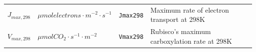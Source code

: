 \documentclass[]{book}
\begin{document}
\begin{longtable}[]{@{}llll@{}}
\begin{minipage}[t]{0.11\columnwidth}\raggedright\strut
\(J_{max, 298}\)\strut
\end{minipage} & \begin{minipage}[t]{0.10\columnwidth}\raggedright\strut
\(\mu mol electrons \cdot m^{-2} \cdot s^{-1}\)\strut
\end{minipage} & \begin{minipage}[t]{0.12\columnwidth}\raggedright\strut
\texttt{Jmax298}\strut
\end{minipage} & \begin{minipage}[t]{0.45\columnwidth}\raggedright\strut
Maximum rate of electron transport at 298K\strut
\end{minipage}\tabularnewline
\begin{minipage}[t]{0.11\columnwidth}\raggedright\strut
\(V_{max, 298}\)\strut
\end{minipage} & \begin{minipage}[t]{0.10\columnwidth}\raggedright\strut
\(\mu mol CO_2 \cdot s^{-1} \cdot m^{-2}\)\strut
\end{minipage} & \begin{minipage}[t]{0.12\columnwidth}\raggedright\strut
\texttt{Vmax298}\strut
\end{minipage} & \begin{minipage}[t]{0.45\columnwidth}\raggedright\strut
Rubisco's maximum carboxylation rate at 298K\strut
\end{minipage}\tabularnewline
\bottomrule
\end{longtable}


\end{document}
